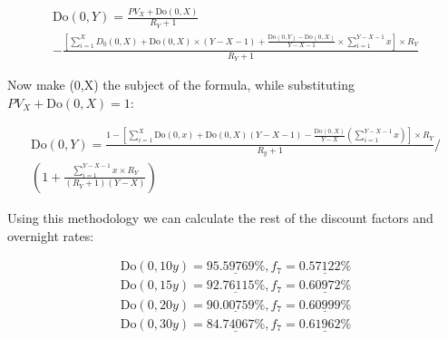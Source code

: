\documentclass[12pt]{article}
\begin{document}
\begin{gather*}
\text{Do}(0, Y) = 
\frac{PV_{X}^{} + \text{Do}(0,X)}{R_Y + 1}
\\
- \frac{\left[\sum_{i=1}^{X} D_0(0, X) + \text{Do}(0,X) \times (Y-X-1) + \frac{\text{Do}(0, Y)-\text{Do}(0, X)}{Y-X-1} \times \sum_{i=1}^{Y-X-1}x \right] \times R_Y}{R_Y + 1}
\end{gather*}

\noindent Now make (0,X) the subject of the formula, while substituting $PV_{X}^{} + \text{Do}(0,X) = 1$:

\begin{gather*}
\text{Do}(0, Y) = 
\frac{1-\left[ \sum_{i=1}^{X}\text{Do}(0,x) + \text{Do}(0,X)(Y-X-1) - \frac{\text{Do}(0,X)}{Y-X}(\sum_{i=1}^{Y-X-1}x)\right] \times R_Y}{R_y + 1} / \\ \left(1+
\frac{\sum_{i=1}^{Y-X-1}x \times R_Y}{(R_Y+1)(Y-X)} \right)
\end{gather*}

\noindent Using this methodology we can calculate the rest of the discount factors and overnight rates:

\begin{gather*}
\text{Do}(0, 10y) = \underline{
95.59769\%
},f_7 = \underline{0.57122\%}\\
\text{Do}(0, 15y) = \underline{
92.76115\%
},f_7 = \underline{0.60972\%}\\
\text{Do}(0, 20y) = \underline{
90.00759\%
},f_7 = \underline{0.60999\%}\\
\text{Do}(0, 30y) = \underline{
84.74067\%
},f_7 = \underline{0.61962\%}\\
\end{gather*}
\end{document}

